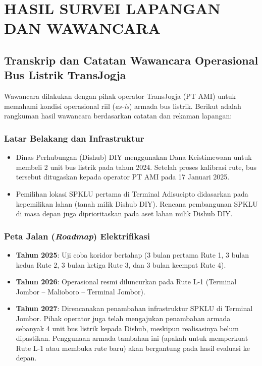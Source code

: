 \cleardoublepage
\chapter{HASIL SURVEI LAPANGAN DAN WAWANCARA}

\section{Transkrip dan Catatan Wawancara Operasional Bus Listrik TransJogja}

Wawancara dilakukan dengan pihak operator TransJogja (PT AMI) untuk memahami kondisi operasional riil (\textit{as-is}) armada bus listrik. Berikut adalah rangkuman hasil wawancara berdasarkan catatan dan rekaman lapangan:

\subsection*{Latar Belakang dan Infrastruktur}
\begin{itemize}
    \item Dinas Perhubungan (Dishub) DIY menggunakan Dana Keistimewaan untuk membeli 2 unit bus listrik pada tahun 2024. Setelah proses kalibrasi rute, bus tersebut ditugaskan kepada operator PT AMI pada 17 Januari 2025.
    \item Pemilihan lokasi SPKLU pertama di Terminal Adisucipto didasarkan pada kepemilikan lahan (tanah milik Dishub DIY). Rencana pembangunan SPKLU di masa depan juga diprioritaskan pada aset lahan milik Dishub DIY.
\end{itemize}

\subsection*{Peta Jalan (\textit{Roadmap}) Elektrifikasi}
\begin{itemize}
    \item \textbf{Tahun 2025}: Uji coba koridor bertahap (3 bulan pertama Rute 1, 3 bulan kedua Rute 2, 3 bulan ketiga Rute 3, dan 3 bulan keempat Rute 4).
    \item \textbf{Tahun 2026}: Operasional resmi diluncurkan pada Rute L-1 (Terminal Jombor -- Malioboro -- Terminal Jombor).
    \item \textbf{Tahun 2027}: Direncanakan penambahan infrastruktur SPKLU di Terminal Jombor. Pihak operator juga telah mengajukan penambahan armada sebanyak 4 unit bus listrik kepada Dishub, meskipun realisasinya belum dipastikan. Penggunaan armada tambahan ini (apakah untuk memperkuat Rute L-1 atau membuka rute baru) akan bergantung pada hasil evaluasi ke depan.
\end{itemize}

